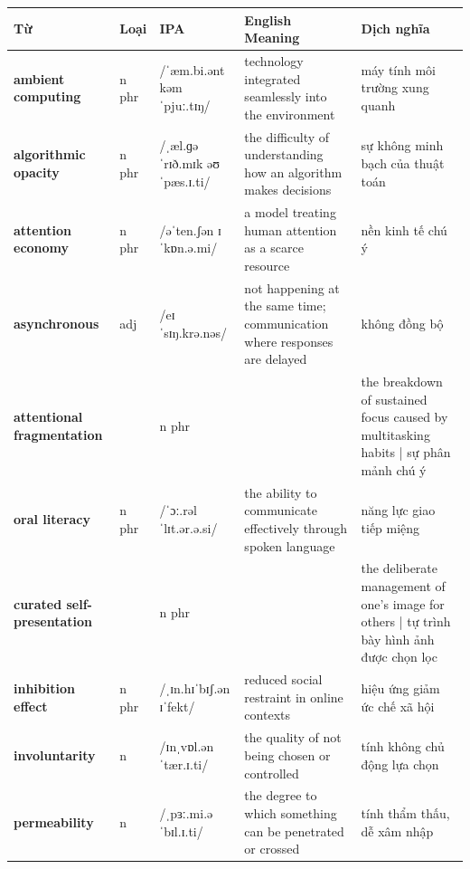 \separator


\vspace{0.8em}
\begin{center}
\renewcommand{\arraystretch}{1.65}
\begin{tabularx}{\textwidth}{|V{0.22\textwidth}|C{0.07\textwidth}|I{0.20\textwidth}|Y|V{0.18\textwidth}|}
\hline
{}
\textbf{Từ} & \textbf{Loại} & \textbf{IPA} & \textbf{English Meaning} & \textbf{Dịch nghĩa} \\
\hline
\textbf{ambient computing} & n phr & /ˈæm.bi.ənt kəmˈpjuː.tɪŋ/ & technology integrated seamlessly into the environment & máy tính môi trường xung quanh \\ \hline
\textbf{algorithmic opacity} & n phr & /ˌæl.ɡəˈrɪð.mɪk əʊˈpæs.ɪ.ti/ & the difficulty of understanding how an algorithm makes decisions & sự không minh bạch của thuật toán \\ \hline
\textbf{attention economy} & n phr & /əˈten.ʃən ɪˈkɒn.ə.mi/ & a model treating human attention as a scarce resource & nền kinh tế chú ý \\ \hline
\textbf{asynchronous} & adj & /eɪˈsɪŋ.krə.nəs/ & not happening at the same time; communication where responses are delayed & không đồng bộ \\ \hline
\textbf{attentional fragmentation} & & n phr & & the breakdown of sustained focus caused by multitasking habits | sự phân mảnh chú ý \\ \hline
\textbf{oral literacy} & n phr & /ˈɔː.rəl ˈlɪt.ər.ə.si/ & the ability to communicate effectively through spoken language & năng lực giao tiếp miệng \\ \hline
\textbf{curated self-presentation} & & n phr & & the deliberate management of one's image for others | tự trình bày hình ảnh được chọn lọc \\ \hline
\textbf{inhibition effect} & n phr & /ˌɪn.hɪˈbɪʃ.ən ɪˈfekt/ & reduced social restraint in online contexts & hiệu ứng giảm ức chế xã hội \\ \hline
\textbf{involuntarity} & n & /ɪnˌvɒl.ənˈtær.ɪ.ti/ & the quality of not being chosen or controlled & tính không chủ động lựa chọn \\ \hline
\textbf{permeability} & n & /ˌpɜː.mi.əˈbɪl.ɪ.ti/ & the degree to which something can be penetrated or crossed & tính thẩm thấu, dễ xâm nhập \\ \hline
\end{tabularx}
\end{center}

